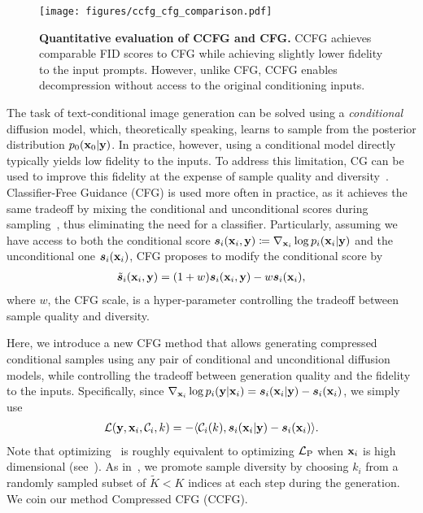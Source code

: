 \begin{figure*}
    \centering
    \texttt{[image: figures/ccfg\_cfg\_comparison.pdf]}
    \caption{\textbf{Quantitative evaluation of CCFG and CFG.} CCFG achieves comparable FID scores to CFG while achieving slightly lower fidelity to the input prompts. However, unlike CFG, CCFG enables decompression without access to the original conditioning inputs.}
    \label{fig:ccfg-cf-quantitative-comparison}
\end{figure*}
The task of text-conditional image generation can be solved using a \emph{conditional} diffusion model, which, theoretically speaking, learns to sample from the posterior distribution $p_{0}({\mathbf{x}}_{0}|{\mathbf{y}})$.
In practice, however, using a conditional model directly typically yields low fidelity to the inputs.
To address this limitation, CG can be used to improve this fidelity at the expense of sample quality and diversity~\citep{dhariwal2021diffusion}.
Classifier-Free Guidance (CFG) is used more often in practice, as it achieves the same tradeoff by mixing the conditional and unconditional scores during sampling~\citep{ho2021classifier}, thus eliminating the need for a classifier.
Particularly, assuming we have access to both the conditional score ${\bm{s}}_{i}({\mathbf{x}}_{i},{\mathbf{y}})\coloneqq\nabla_{{\mathbf{x}}_{i}}\log{p_{i}({\mathbf{x}}_{i}|{\mathbf{y}})}$ and the unconditional one ${\bm{s}}_{i}({\mathbf{x}}_{i})$, CFG proposes to modify the conditional score by
\begin{align}
    \tilde{{\bm{s}}}_{i}({\mathbf{x}}_{i},{\mathbf{y}})=(1+w){\bm{s}}_{i}({\mathbf{x}}_{i},{\mathbf{y}})-w{\bm{s}}_{i}({\mathbf{x}}_{i}),
\end{align}
where $w$, the CFG scale, is a hyper-parameter controlling the tradeoff between sample quality and diversity.

Here, we introduce a new CFG method that allows generating compressed conditional samples using any pair of conditional and unconditional diffusion models, while controlling the tradeoff between generation quality and the fidelity to the inputs.
Specifically, since $\nabla_{{\mathbf{x}}_{i}}\log{p_{i}({\mathbf{y}}|{\mathbf{x}}_{i})}={\bm{s}}_{i}({\mathbf{x}}_{i}|{\mathbf{y}})-{\bm{s}}_{i}({\mathbf{x}}_{i})$, we simply use
\begin{align}
    {\mathcal{L}}({\mathbf{y}},{\mathbf{x}}_{i},{\mathcal{C}}_{i},k)=-\langle{\mathcal{C}}_{i}(k),{\bm{s}}_{i}({\mathbf{x}}_{i}|{\mathbf{y}})-{\bm{s}}_{i}({\mathbf{x}}_{i})\rangle.\label{eq:l_ccfg}
\end{align}
Note that optimizing~ is roughly  equivalent to optimizing ${\mathcal{L}}_{\text{P}}$ when ${\mathbf{x}}_{i}$ is high dimensional (see~).
As in~, we promote sample diversity by choosing $k_{i}$ from a randomly sampled subset of $\tilde{K}<K$ indices at each step during the generation.
We coin our method Compressed CFG (CCFG).

